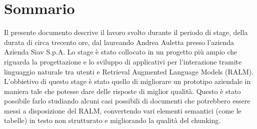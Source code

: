 \cleardoublepage
{}
{}
\begingroup
\let\clearpage\relax
\let\cleardoublepage\relax
\let\cleardoublepage\relax

\chapter*{Sommario}

Il presente documento descrive il lavoro svolto durante il periodo di stage, della durata di circa trecento ore, dal laureando Andrea Auletta presso l'azienda Azienda Siav S.p.A.
Lo stage è stato collocato in un progetto più ampio che riguarda la progettazione e lo sviluppo di applicativi per l'interazione tramite linguaggio naturale
tra utenti e Retrieval Augmented Language Models (RALM).
L'obbietivo di questo stage è stato quello di migliorare un prototipo aziendale in maniera tale che potesse dare delle risposte di miglior qualità.
Questo è stato possibile farlo studiando alcuni casi possibili di documenti che potrebbero essere messi a disposizione del RALM, convertendo vari elementi semantici (come le tabelle) in testo non strutturato e migliorando la qualità del chunking.




\endgroup

\vfill
